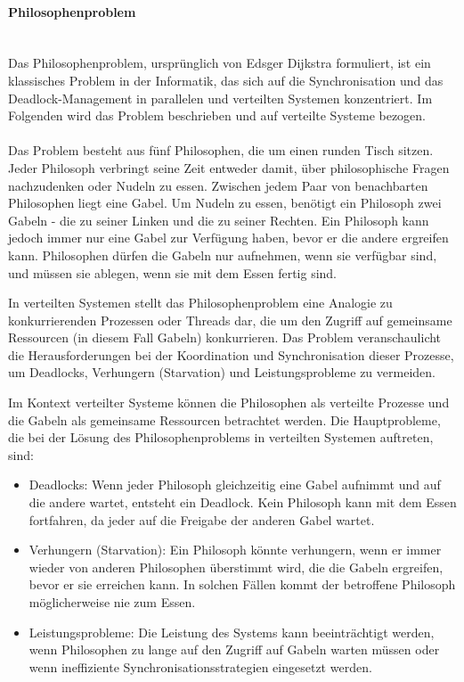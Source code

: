 \documentclass[../vs-script-first-v01.tex]{subfiles}
\begin{document}
\paragraph{Philosophenproblem\\\\}
Das Philosophenproblem, ursprünglich von Edsger Dijkstra formuliert, ist ein klassisches Problem in der Informatik, das sich auf die Synchronisation und das Deadlock-Management in parallelen und verteilten Systemen konzentriert. Im Folgenden wird das Problem beschrieben und auf verteilte Systeme bezogen.
\\\\
Das Problem besteht aus fünf Philosophen, die um einen runden Tisch sitzen. Jeder Philosoph verbringt seine Zeit entweder damit, über philosophische Fragen nachzudenken oder Nudeln zu essen. Zwischen jedem Paar von benachbarten Philosophen liegt eine Gabel. Um Nudeln zu essen, benötigt ein Philosoph zwei Gabeln - die zu seiner Linken und die zu seiner Rechten. Ein Philosoph kann jedoch immer nur eine Gabel zur Verfügung haben, bevor er die andere ergreifen kann. Philosophen dürfen die Gabeln nur aufnehmen, wenn sie verfügbar sind, und müssen sie ablegen, wenn sie mit dem Essen fertig sind.

In verteilten Systemen stellt das Philosophenproblem eine Analogie zu konkurrierenden Prozessen oder Threads dar, die um den Zugriff auf gemeinsame Ressourcen (in diesem Fall Gabeln) konkurrieren. Das Problem veranschaulicht die Herausforderungen bei der Koordination und Synchronisation dieser Prozesse, um Deadlocks, Verhungern (Starvation) und Leistungsprobleme zu vermeiden.

Im Kontext verteilter Systeme können die Philosophen als verteilte Prozesse und die Gabeln als gemeinsame Ressourcen betrachtet werden. Die Hauptprobleme, die bei der Lösung des Philosophenproblems in verteilten Systemen auftreten, sind:
\begin{itemize}
\item Deadlocks: Wenn jeder Philosoph gleichzeitig eine Gabel aufnimmt und auf die andere wartet, entsteht ein Deadlock. Kein Philosoph kann mit dem Essen fortfahren, da jeder auf die Freigabe der anderen Gabel wartet.
\item Verhungern (Starvation): Ein Philosoph könnte verhungern, wenn er immer wieder von anderen Philosophen überstimmt wird, die die Gabeln ergreifen, bevor er sie erreichen kann. In solchen Fällen kommt der betroffene Philosoph möglicherweise nie zum Essen.
\item Leistungsprobleme: Die Leistung des Systems kann beeinträchtigt werden, wenn Philosophen zu lange auf den Zugriff auf Gabeln warten müssen oder wenn ineffiziente Synchronisationsstrategien eingesetzt werden.
\end{itemize}
\end{document}
